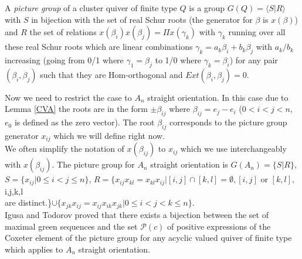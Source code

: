 \begin{definition}
\cite{IT17} A \textit{picture group} of a cluster quiver of finite type $Q$ is a group $G(Q)=\langle S|R\rangle$ with $S$ in bijection with the set of real Schur roots (the generator for $\beta$ is $x(\beta)$) and $R$ the set of relations $x(\beta_i)x(\beta_j)=\Pi x(\gamma_k)$ with $\gamma_k$ running over all these real Schur roots which are linear combinations $\gamma_k = a_k\beta_i+b_k\beta_j$ with $a_k/b_k$ increasing (going from 0/1 where $\gamma_1=\beta_j$ to 1/0 where $\gamma_k=\beta_i$) for any pair $(\beta_i,\beta_j)$ such that they are Hom-orthogonal and $Ext(\beta_i,\beta_j)=0$.\\
\end{definition}
\indent Now we need to restrict the case to $A_n$ straight orientation. In this case due to Lemma \ref{CVA} the roots are in the form $\pm\beta_{ij}$ where $\beta_{ij}=e_j-e_i$ ($0<i<j<n$, $e_0$ is defined as the zero vector). The root $\beta_{ij}$ corresponds to the picture group generator $x_{ij}$ which we will define right now.\\
\indent We often simplify the notation of $x(\beta_{ij})$ to $x_{ij}$ which we use interchangeably with $x(\beta_{ij})$. The picture group for $A_n$ straight orientation is $G(A_n)=\{S|R\}$, $S=\{x_{ij}|0\leq i<j\leq n\}$, $R=\{x_{ij}x_{kl}=x_{kl}x_{ij}|[i,j]\cap[k,l]=\emptyset, [i,j]\text{ or }[k,l], $ i,j,k,l \\are distinct.\}$\cup\{x_{jk}x_{ij}=x_{ij}x_{ik}x_{jk}|0\leq i<j<k\leq n\}$.\\
\indent Igusa and Todorov proved \cite{IT17} that there exists a bijection between the set of maximal green sequences and the set $\mathcal{P}(c)$ of positive expressions of the Coxeter element of the picture group for any acyclic valued quiver of finite type which applies to $A_n$ straight orientation.\\
